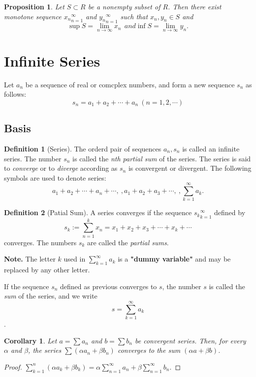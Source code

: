 \documentclass{article}
\newtheorem{corollary}[theorem]{Corollary}
\newtheorem{prop}[theorem]{Proposition}
\theoremstyle{definition}
\newtheorem{defi}{Definition}[section]
\begin{document}
\begin{prop}
    Let $S\subset R$ be a nonempty subset of $R$. Then there exist monotone sequence ${x_{n}}_{n=1}^{\infty}$ and ${y_{n}}_{n=1}^{\infty}$ such that $x_{n},y_{n}\in S$ and
    $$\sup S = \lim_{n\to \infty}x_{n}\ \ and \inf S = \lim_{n\to \infty}y_{n}.$$ 
\end{prop}




\section{Infinite Series}
Let ${a_{n}}$ be a sequence of real or comcplex
numbers, and form a new sequence ${s_{n}}$ as follows:
$$s_{n}=a_{1}+a_{2}+\cdots +a_{n}\ (n=1,2,\cdots)$$

\subsection{Basis}
\begin{defi}[Series]
The orderd pair of sequences ${a_{n}},{s_{n}}$ is 
called an infinite series. The number $s_{n}$ is called 
the \textit{nth partial sum} of the series. The series is said 
to \textit{converge} or to \textit{diverge} according 
as ${s_{n}}$ is convergent or divergent. The following 
symbols are used to denote series:
$$a_{1}+a_{2}+\cdots +a_{n}+\cdots,\ ,a_{1}+a_{2}+a_{3}+\cdots,\ ,\sum_{k=1}^{\infty}a_{k}.$$
\end{defi}

\begin{defi}[Patial Sum]
A series converges if the sequence ${s_{k}}_{k=1}^{\infty}$ defined by 
$$s_{k}:=\sum_{n=1}^{k}x_{n}=x_{1}+x_{2}+x_{3}+\cdots +x_{k}+\cdots$$
converges. The numbers $s_{k}$ are called the \textit{partial sums}.
\end{defi}

\textbf{Note.} The letter $k$ used in $\sum_{k=1}^{\infty}a_{k}$ 
is a \textbf{"dummy variable"} and may be replaced by 
any other letter.

If the sequence ${s_{n}}$ defined as previous converges to $s$, the 
number $s$ is called the \textit{sum} of the series, and we write
$$ s=\sum_{k=1}^{\infty}a_{k}$$.

\begin{corollary}
    Let $a=\sum a_{n}$ and $b=\sum b_{n}$ be convergent 
    series. Then, for every $\alpha$ and $\beta$, the series $\sum (\alpha a_{n}+\beta b_{n})$
    converges to the sum $(\alpha a+\beta b)$.
\end{corollary}
\begin{proof}
    $\sum_{k=1}^{n} (\alpha a_{k}+\beta b_{k})=\alpha \sum_{n=1}^{\infty}a_{n}+\beta \sum_{n=1}^{\infty}b_{n}.$
\end{proof}
\end{document}
